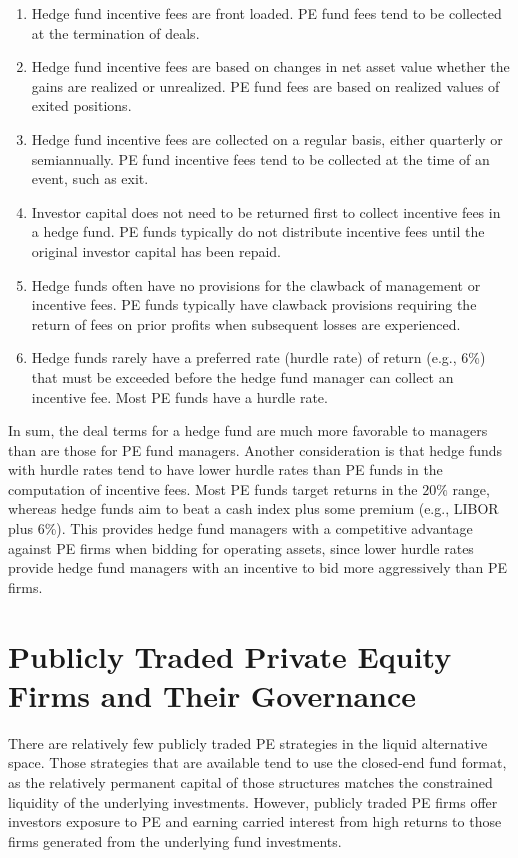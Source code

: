 \documentclass[11pt]{article}
\begin{document}
\begin{enumerate}
  \item Hedge fund incentive fees are front loaded. PE fund fees tend to be collected at the termination of deals.

  \item Hedge fund incentive fees are based on changes in net asset value whether the gains are realized or unrealized. PE fund fees are based on realized values of exited positions.

  \item Hedge fund incentive fees are collected on a regular basis, either quarterly or semiannually. PE fund incentive fees tend to be collected at the time of an event, such as exit.

  \item Investor capital does not need to be returned first to collect incentive fees in a hedge fund. PE funds typically do not distribute incentive fees until the original investor capital has been repaid.

  \item Hedge funds often have no provisions for the clawback of management or incentive fees. PE funds typically have clawback provisions requiring the return of fees on prior profits when subsequent losses are experienced.

  \item Hedge funds rarely have a preferred rate (hurdle rate) of return (e.g., 6\%) that must be exceeded before the hedge fund manager can collect an incentive fee. Most PE funds have a hurdle rate.

\end{enumerate}

In sum, the deal terms for a hedge fund are much more favorable to managers than are those for PE fund managers. Another consideration is that hedge funds with hurdle rates tend to have lower hurdle rates than PE funds in the computation of incentive fees. Most PE funds target returns in the $20 \%$ range, whereas hedge funds aim to beat a cash index plus some premium (e.g., LIBOR plus 6\%). This provides hedge fund managers with a competitive advantage against PE firms when bidding for operating assets, since lower hurdle rates provide hedge fund managers with an incentive to bid more aggressively than PE firms.

\section*{Publicly Traded Private Equity Firms and Their Governance}
There are relatively few publicly traded PE strategies in the liquid alternative space. Those strategies that are available tend to use the closed-end fund format, as the relatively permanent capital of those structures matches the constrained liquidity of the underlying investments. However, publicly traded PE firms offer investors exposure to PE and earning carried interest from high returns to those firms generated from the underlying fund investments.
\end{document}
